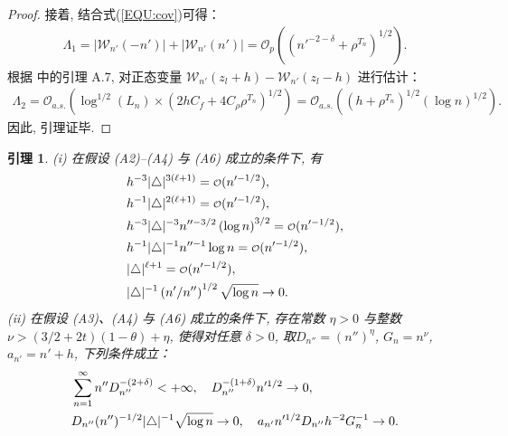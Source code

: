 \documentclass[a4paper,openay,14pt]{ctexbook}
\newtheorem{lem}{引理}
\numberwithin{equation}{section}
\numberwithin{lem}{section}
\begin{document}
\begin{proof}
接着, 结合式(\ref{EQU:cov})可得：
\begin{align*}
    \Lambda_1 = \left\vert \mathcal{W}_{n'}(-n')\right\vert+ \left\vert \mathcal{W}_{n'}(n')\right\vert = \mathcal{O}_{p}\left(\left(n'^{-2-\delta}+\rho^{T_n}\right)^{1/2}\right).
\end{align*}
根据 \cite{wang2022oracle} 中的引理 A.7, 对正态变量 $\mathcal{W}_{n'}(z_l+h) - \mathcal{W}_{n'}(z_l-h)$ 进行估计：
\begin{align*}
    \Lambda_2 = \mathcal{O}_{a.s.}\left(\log^{1/2}(L_n)\times(2hC_f+4C_{\rho}{\rho}^{T_n})^{1/2}\right) = \mathcal{O}_{a.s.}\left(\left(h+\rho^{T_n}\right)^{1/2}\left(\log n\right)^{1/2}\right).
\end{align*}
因此, 引理证毕.
\end{proof}


\begin{lem} \label{Lemma:order}
    (i) 在假设 (A2)--(A4) 与 (A6) 成立的条件下, 有
    \begin{align}
        & h^{-3}\vert \triangle \vert ^{3(\ell+1)} = {\scriptstyle{\mathcal{O}}}(n'^{-1/2}),\label{EQ:h^-3delta^3d+3}\\
        & h^{-1} \vert \triangle \vert ^{2(\ell+1)} = {\scriptstyle{\mathcal{O}}}(n'^{-1/2}), \notag\\ 
        & h^{-3}\vert \triangle \vert ^{-3} n''^{-3/2} \left(\log n \right)^{3/2} = {\scriptstyle{\mathcal{O}}}(n'^{-1/2}),\label{EQ:h^-3delta^-3} \\ 
        & h^{-1}\vert \triangle \vert^{-1}n''^{-1}
        \log n = {\scriptstyle{\mathcal{O}}}(n'^{-1/2}),\notag\\
        & \vert\triangle \vert^{\ell+1}= {\scriptstyle{\mathcal{O}}}(n'^{-1/2}), \label{EQ:delta^d+1}\\
        & \vert\triangle\vert^{-1} \left(n'/n''\right)^{1/2}\sqrt{\log n}\to 0.\label{EQ:delta^-1n'/n''}
    \end{align}
    (ii) 在假设 (A3)、(A4) 与 (A6) 成立的条件下, 存在常数 $\eta>0$ 与整数$\nu>(3/2+2t)(1-\theta)+\eta$, 使得对任意 $\delta>0$, 取$D_{n''}=(n'')^{\eta}$, $G_n=n^{\nu}$, $a_{n'}=n'+h$, 下列条件成立：
    \begin{align}
        & \sum_{n=1}^{\infty} n''D_{n''}^{-(2+\delta)} < +\infty, \quad D_{n''}^{-(1+\delta)} n'^{1/2} \to 0,\label{EQ:Dn''order}\\
        & D_{n''}(n'')^{-1/2}\vert\triangle\vert^{-1}\sqrt{\log n} \to 0, \quad a_{n'}n'^{1/2}D_{n''}h^{-2}G_n^{-1}\to 0.\notag
    \end{align}
\end{lem}
\end{document}
